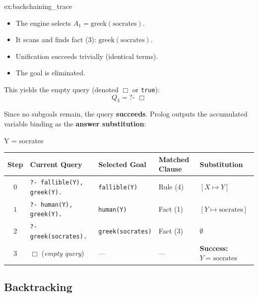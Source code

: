 \begin{example}[Backchaining]{ex:backchaining_trace}
\begin{enumerate}[label=\textbf{Step \arabic*:}, leftmargin=*]
\begin{itemize}
        \item The engine selects $A_1 = \text{greek}(\text{socrates})$.
        \item It scans and finds fact (3): $\text{greek}(\text{socrates}).$
        \item Unification succeeds trivially (identical terms).
        \item The goal is eliminated.
    \end{itemize}
    This yields the empty query (denoted $\Box$ or \texttt{true}):
    \[
    Q_3 = \text{?- } \Box
    \]
\end{enumerate}
Since no subgoals remain, the query \textbf{succeeds}. Prolog outputs the accumulated variable binding as the \textbf{answer substitution}:
\begin{codeblock}
Y = socrates
\end{codeblock}
\end{example}

\begin{center}
\small
\begin{tabular}{cllll}
\toprule
\textbf{Step} & \textbf{Current Query} & \textbf{Selected Goal} & \textbf{Matched Clause} & \textbf{Substitution} \\
\midrule
$0$ & \texttt{?- fallible(Y), greek(Y).} & \texttt{fallible(Y)} & Rule (4) & $[X \mapsto Y]$ \\
$1$ & \texttt{?- human(Y), greek(Y).}    & \texttt{human(Y)}    & Fact (1) & $[Y \mapsto \text{socrates}]$ \\
$2$ & \texttt{?- greek(socrates).}       & \texttt{greek(socrates)} & Fact (3) & $\emptyset$ \\
$3$ & $\Box$ (\textit{empty query})      & ---                  & ---      & \textbf{Success: } $Y = \text{socrates}$ \\
\bottomrule
\end{tabular}
\end{center}

\subsection{Backtracking}

